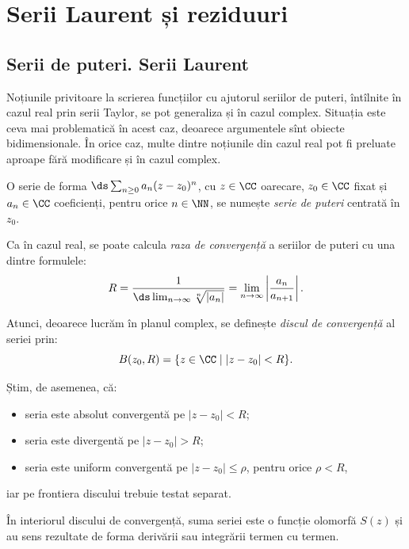 
\chapter{Serii Laurent și reziduuri}

\section{Serii de puteri. Serii Laurent}

Noțiunile privitoare la scrierea funcțiilor cu ajutorul seriilor de puteri,
întîlnite în cazul real prin serii Taylor, se pot generaliza și în cazul
complex. Situația este ceva mai problematică în acest caz, deoarece
argumentele sînt obiecte bidimensionale. În orice caz, multe dintre noțiunile
din cazul real pot fi preluate aproape fără modificare și în cazul complex.

\begin{definition}\label{def:serie-cpx}
  O serie de forma $ \ds\sum_{n \geq 0} a_n(z - z_0)^n $, cu $ z \in \CC $
  oarecare, $ z_0 \in \CC $ fixat și $ a_n \in \CC $ coeficienți, pentru
  orice $ n \in \NN $, se numește \emph{serie de puteri} centrată în $ z_0 $.
\end{definition}

Ca în cazul real, se poate calcula \emph{raza de convergență} a seriilor
de puteri cu una dintre formulele:
\[
  R = \dfrac{1}{\ds\lim_{n \to \infty} \sqrt[n]{|a_n|}} = %
  \lim_{n \to \infty} \left| \dfrac{a_n}{a_{n+1}} \right|.
\]

Atunci, deoarece lucrăm în planul complex, se definește \emph{discul de convergență}
al seriei prin:
\[
  B(z_0,R) = \{ z \in \CC \mid | z - z_0| < R \}.
\]

Știm, de asemenea, că:
\begin{itemize}
\item seria este absolut convergentă pe $ |z - z_0| < R $;
\item seria este divergentă pe $ |z - z_0| > R $;
\item seria este uniform convergentă pe $ |z - z_0| \leq \rho $, pentru
  orice $ \rho < R $,
\end{itemize}
iar pe frontiera discului trebuie testat separat.

În interiorul discului de convergență, suma seriei este o funcție olomorfă $ S(z) $
și au sens rezultate de forma derivării sau integrării termen cu termen.

